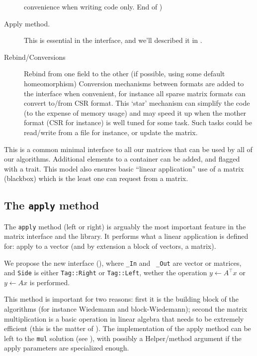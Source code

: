 \begin{description}
		convenience when writing code only. End of \danger)
%
	\item[Apply method.]
		This is essential in the \applin interface, and we'll described
		it in .
%
	\item[Rebind/Conversions] Rebind from one field to the other (if
		possible, using some default homeomorphism)
%
	 Conversion mechanisms between formats are added to the interface when
	 convenient, for instance all sparse matrix formats can convert to/from
	 CSR format.  This `star' mechanism can simplify the code (to the
	 expense of memory usage) and may speed it up when the mother format
	 (CSR for instance) is well tuned for some task. Such tasks could be
	 read/write from a file for instance, or update the matrix.
%
\end{description}
%
This is a common minimal interface to all our matrices that can be used by all
of our algorithms. Additional elements to a container can be added, and flagged
with a trait. This model also ensures basic ``linear application'' use of a
matrix (blackbox) which is the least one can request from a matrix.
%
\subsection{The \texttt{apply} method}\label{ssec:apply}
%
%
\par
%
The \texttt{apply} method (left or right) is arguably the most important
feature in the matrix interface and the \linbox library. It performs what a
linear application is defined for: apply to a vector (and by extension  a block
of vectors, \ie a matrix).
%
\par
%
We propose the new interface (), where {\tt \_In} and {\tt
\_Out} are vector or matrices, and {\tt Side} is either {\tt Tag::Right} or
{\tt Tag::Left}, wether the operation $y \gets A^{\top} x$ or  $y \gets A x$ is
performed.
%

%
This method is important for two reasons: first it is the building block of the
\applin algorithms (for instance Wiedemann and block-Wiedemann); second the
matrix multiplication is a basic operation in linear algebra that needs to be
extremely efficient (this is the matter of ).  The
implementation of the apply method can be left to the {\tt mul} solution (see
), with possibly a Helper/method argument if the apply
parameters are specialized enough.
%
%
%
